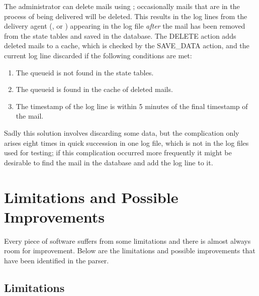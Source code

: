 \label{Mails deleted during delivery}

The administrator can delete mails using ; occasionally
mails that are in the process of being delivered will be deleted.  This
results in the log lines from the delivery agent (,
 or ) appearing in the log file
\textit{after\/} the mail has been removed from the state tables and saved
in the database.  The DELETE action adds deleted mails to a cache, which is
checked by the SAVE\_DATA action, and the current log line discarded if the
following conditions are met:

\begin{enumerate}

    \item The queueid is not found in the state tables. 

    \item The queueid is found in the cache of deleted mails.

    \item The timestamp of the log line is within 5 minutes of the final
        timestamp of the mail.

\end{enumerate}

Sadly this solution involves discarding some data, but the complication
only arises eight times in quick succession in one log file, which is not
in the \numberOFlogFILES{} log files used for testing; if this complication
occurred more frequently it might be desirable to find the mail in the
database and add the log line to it.

\section{Limitations and Possible Improvements}

\label{limitations and improvements in implementation}

Every piece of software suffers from some limitations and there is almost
always room for improvement.  Below are the limitations and possible
improvements that have been identified in the parser.

\subsection{Limitations}

\label{logging helo}

